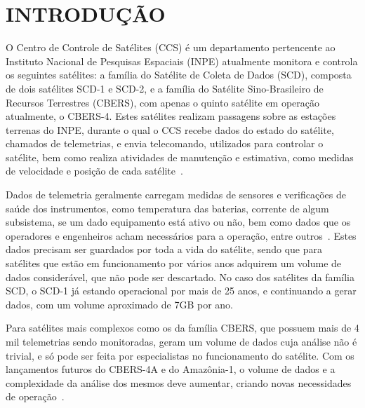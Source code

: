 
\chapter{INTRODUÇÃO}\label{ch:intro}

O Centro de Controle de Satélites (CCS) é um departamento pertencente ao Instituto Nacional de Pesquisas Espaciais (INPE) atualmente monitora e controla os seguintes satélites: a família do Satélite de Coleta de Dados (SCD), composta de dois satélites SCD-1 e SCD-2, e a família do Satélite Sino-Brasileiro de Recursos Terrestres (CBERS), com apenas o quinto satélite em operação atualmente, o CBERS-4.
Estes satélites realizam passagens sobre as estações terrenas do INPE, durante o qual o CCS recebe dados do estado do satélite, chamados de telemetrias, e envia telecomando, utilizados para controlar o satélite, bem como realiza atividades de manutenção e estimativa, como medidas de velocidade e posição de cada satélite~\cite{AzevedoAmbr:2010:ArSaTe}.

Dados de telemetria geralmente carregam medidas de sensores e verificações de saúde dos instrumentos, como temperatura das baterias, corrente de algum subsistema, se um dado equipamento está ativo ou não, bem como dados que os operadores e engenheiros acham necessários para a operação, entre outros~\cite{larsonSpaceMissionAnalysis1999}.
Estes dados precisam ser guardados por toda a vida do satélite, sendo que para satélites que estão em funcionamento por vários anos adquirem um volume de dados considerável, que não pode ser descartado.
No caso dos satélites da família SCD, o SCD-1 já estando operacional por mais de 25 anos, e continuando a gerar dados, com um volume aproximado de 7GB por ano.

Para satélites mais complexos como os da família CBERS, que possuem mais de 4 mil telemetrias sendo monitoradas, geram um volume de dados cuja análise não é trivial, e só pode ser feita por especialistas no funcionamento do satélite.
Com os lançamentos futuros do CBERS-4A e do Amazônia-1, o volume de dados e a complexidade da análise dos mesmos deve aumentar, criando novas necessidades de operação~\cite{JulioFoAmbrFerrLour:2017:ChImSp}.

